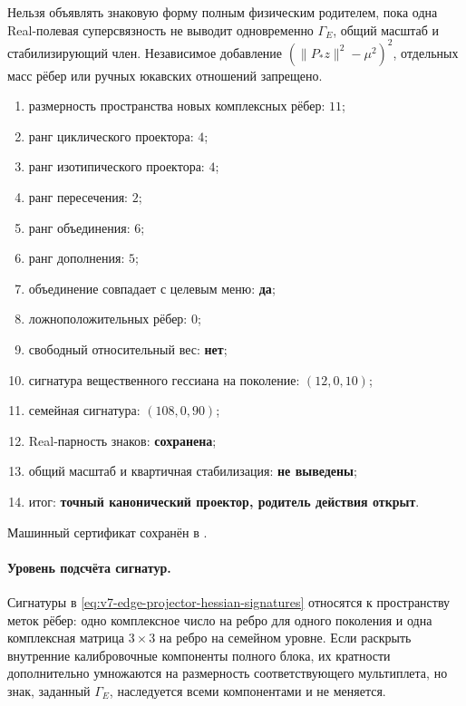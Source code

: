 \begin{nogocriterion}
Нельзя объявлять знаковую форму полным физическим родителем, пока одна
Real-полевая суперсвязность не выводит одновременно $\Gamma_E$, общий
масштаб и стабилизирующий член. Независимое добавление
$(\|P_*z\|^2-\mu^2)^2$, отдельных масс рёбер или ручных юкавских отношений
запрещено.
\end{nogocriterion}

\begin{protocol}
\begin{enumerate}
 \item размерность пространства новых комплексных рёбер: \textbf{$11$};
 \item ранг циклического проектора: \textbf{$4$};
 \item ранг изотипического проектора: \textbf{$4$};
 \item ранг пересечения: \textbf{$2$};
 \item ранг объединения: \textbf{$6$};
 \item ранг дополнения: \textbf{$5$};
 \item объединение совпадает с целевым меню: \textbf{да};
 \item ложноположительных рёбер: \textbf{$0$};
 \item свободный относительный вес: \textbf{нет};
 \item сигнатура вещественного гессиана на поколение: \textbf{$(12,0,10)$};
 \item семейная сигнатура: \textbf{$(108,0,90)$};
 \item Real-парность знаков: \textbf{сохранена};
 \item общий масштаб и квартичная стабилизация: \textbf{не выведены};
 \item итог: \textbf{точный канонический проектор, родитель действия открыт}.
\end{enumerate}
\end{protocol}

Машинный сертификат сохранён в
.

\paragraph{Уровень подсчёта сигнатур.}
Сигнатуры в \eqref{eq:v7-edge-projector-hessian-signatures} относятся к
пространству меток рёбер: одно комплексное число на ребро для одного
поколения и одна комплексная матрица $3\times3$ на ребро на семейном уровне.
Если раскрыть внутренние калибровочные компоненты полного блока, их
кратности дополнительно умножаются на размерность соответствующего
мультиплета, но знак, заданный $\Gamma_E$, наследуется всеми компонентами и
не меняется.


